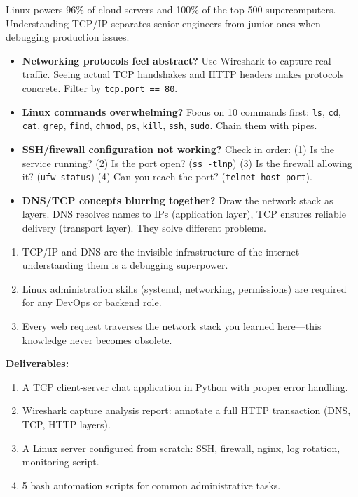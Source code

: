 \documentclass[11pt, a4paper, oneside]{report}
\begin{document}
\begin{realworldbox}
Linux powers 96\% of cloud servers and 100\% of the top 500 supercomputers. Understanding TCP/IP separates senior engineers from junior ones when debugging production issues.
\end{realworldbox}


\begin{stuckbox}
\begin{itemize}[leftmargin=*]
\item \textbf{Networking protocols feel abstract?} Use Wireshark to capture real traffic. Seeing actual TCP handshakes and HTTP headers makes protocols concrete. Filter by \texttt{tcp.port == 80}.
\item \textbf{Linux commands overwhelming?} Focus on 10 commands first: \texttt{ls}, \texttt{cd}, \texttt{cat}, \texttt{grep}, \texttt{find}, \texttt{chmod}, \texttt{ps}, \texttt{kill}, \texttt{ssh}, \texttt{sudo}. Chain them with pipes.
\item \textbf{SSH/firewall configuration not working?} Check in order: (1) Is the service running? (2) Is the port open? (\texttt{ss -tlnp}) (3) Is the firewall allowing it? (\texttt{ufw status}) (4) Can you reach the port? (\texttt{telnet host port}).
\item \textbf{DNS/TCP concepts blurring together?} Draw the network stack as layers. DNS resolves names to IPs (application layer), TCP ensures reliable delivery (transport layer). They solve different problems.
\end{itemize}
\end{stuckbox}


\begin{takeawaybox}
\begin{enumerate}[leftmargin=*]
\item TCP/IP and DNS are the invisible infrastructure of the internet---understanding them is a debugging superpower.
\item Linux administration skills (systemd, networking, permissions) are required for any DevOps or backend role.
\item Every web request traverses the network stack you learned here---this knowledge never becomes obsolete.
\end{enumerate}
\end{takeawaybox}

\begin{milestonebox}
\textbf{Deliverables:}
\begin{enumerate}[leftmargin=*]
\item A TCP client-server chat application in Python with proper error handling.
\item Wireshark capture analysis report: annotate a full HTTP transaction (DNS, TCP, HTTP layers).
\item A Linux server configured from scratch: SSH, firewall, nginx, log rotation, monitoring script.
\item 5 bash automation scripts for common administrative tasks.
\end{enumerate}
\end{milestonebox}
\end{document}
